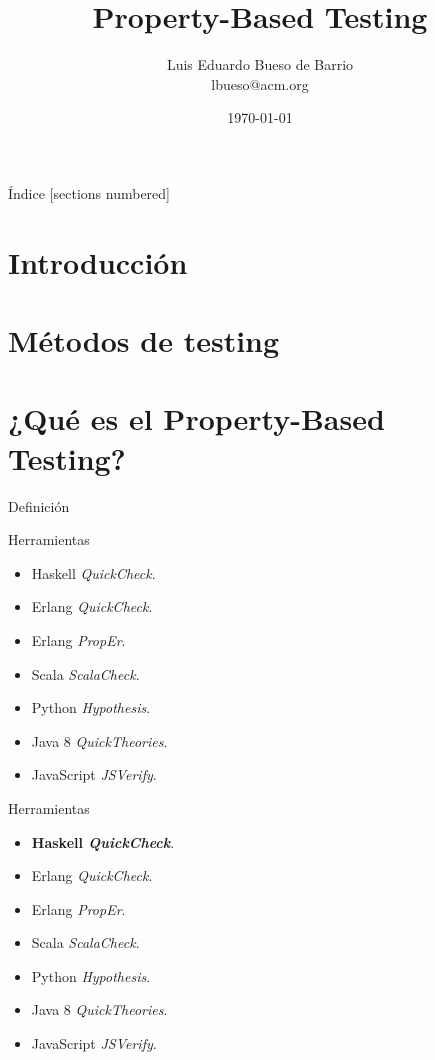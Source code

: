 \documentclass[10pt]{beamer}
\title{Property-Based Testing}
\date{\today}
\author{
  Luis Eduardo Bueso de Barrio\\
  lbueso@acm.org
}
\institute{ACM PLIG}
\begin{document}
\nocite{*}

\maketitle

\begin{frame}{Índice}
  [sections numbered]
  \tableofcontents[hideallsubsections]
\end{frame}

\section{Introducción}

\section{Métodos de testing}

\section{¿Qué es el Property-Based Testing?}

\begin{frame}{Definición}
\end{frame}

\begin{frame}{Herramientas}
  \begin{itemize}
  \item Haskell \textit{QuickCheck}.
  \item Erlang \textit{QuickCheck}.
  \item Erlang \textit{PropEr}.
  \item Scala \textit{ScalaCheck}.
  \item Python \textit{Hypothesis}.
  \item Java 8 \textit{QuickTheories}.
  \item JavaScript \textit{JSVerify}.
  \end{itemize}
\end{frame}

\begin{frame}{Herramientas}
  \begin{itemize}
  \item \textbf{Haskell \textit{QuickCheck}}.
  \item Erlang \textit{QuickCheck}.
  \item Erlang \textit{PropEr}.
  \item Scala \textit{ScalaCheck}.
  \item Python \textit{Hypothesis}.
  \item Java 8 \textit{QuickTheories}.
  \item JavaScript \textit{JSVerify}.
  \end{itemize}
\end{frame}
\end{document}
